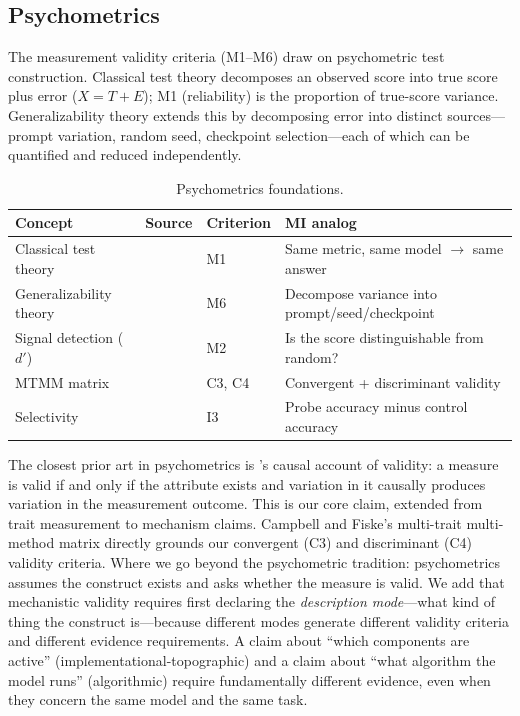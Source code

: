 \documentclass{article}
\begin{document}
\subsection{Psychometrics}
\label{sec:psychometrics}

The measurement validity criteria (M1--M6) draw on psychometric test construction. Classical test theory decomposes an observed score into true score plus error ($X = T + E$); M1 (reliability) is the proportion of true-score variance. Generalizability theory extends this by decomposing error into distinct sources---prompt variation, random seed, checkpoint selection---each of which can be quantified and reduced independently.

\begin{table}[H]
\centering\small
\caption{Psychometrics foundations.}
\renewcommand{\arraystretch}{1.12}
\begin{tabular}{@{}l>{\raggedright\arraybackslash}p{2.2cm}l>{\raggedright\arraybackslash}p{4.5cm}@{}}
\toprule
\textbf{Concept} & \textbf{Source} & \textbf{Criterion} & \textbf{MI analog} \\
\midrule
Classical test theory & \citet{lord1968statistical} & M1 & Same metric, same model $\to$ same answer \\
\midrule
Generalizability theory & \citet{cronbach1972dependability} & M6 & Decompose variance into prompt/seed/checkpoint \\
\midrule
Signal detection ($d'$) & \citet{green1966signal} & M2 & Is the score distinguishable from random? \\
\midrule
MTMM matrix & \citet{campbell1959convergent} & C3, C4 & Convergent + discriminant validity \\
\midrule
Selectivity & \citet{hewitt2019designing} & I3 & Probe accuracy minus control accuracy \\
\bottomrule
\end{tabular}
\end{table}

The closest prior art in psychometrics is \citet{borsboom2004concept}'s causal account of validity: a measure is valid if and only if the attribute exists and variation in it causally produces variation in the measurement outcome. This is our core claim, extended from trait measurement to mechanism claims. Campbell and Fiske's \citep{campbell1959convergent} multi-trait multi-method matrix directly grounds our convergent (C3) and discriminant (C4) validity criteria. Where we go beyond the psychometric tradition: psychometrics assumes the construct exists and asks whether the measure is valid. We add that mechanistic validity requires first declaring the \emph{description mode}---what kind of thing the construct is---because different modes generate different validity criteria and different evidence requirements. A claim about ``which components are active'' (implementational-topographic) and a claim about ``what algorithm the model runs'' (algorithmic) require fundamentally different evidence, even when they concern the same model and the same task.
\end{document}
